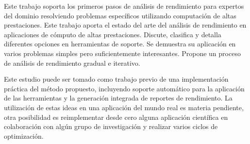 \documentclass[a4paper]{report}
\begin{document}
\bigskip

Este trabajo soporta los primeros pasos de análisis de rendimiento para expertos del dominio resolviendo problemas específicos utilizando computación de altas prestaciones.
Este trabajo aporta el estado del arte del análisis de rendimiento en
aplicaciones de cómputo de altas prestaciones. Discute, clasifica y detalla
diferentes opciones en herramientas de soporte. Se demuestra su aplicación
en varios problemas simples pero suficientemente interesantes. Propone un
proceso de análisis de rendimiento gradual e iterativo.

\bigskip

Este estudio puede ser tomado como trabajo previo de una implementación práctica del método propuesto,
incluyendo soporte automático para la aplicación de las herramientas y la generación integrada de
reportes de rendimiento. La utilización de estas ideas en una aplicación del mundo real es materia
pendiente, otra posibilidad es reimplementar desde cero alguna aplicación
científica en colaboración con algún grupo de investigación y realizar
varios ciclos de optimización.


\end{document}
